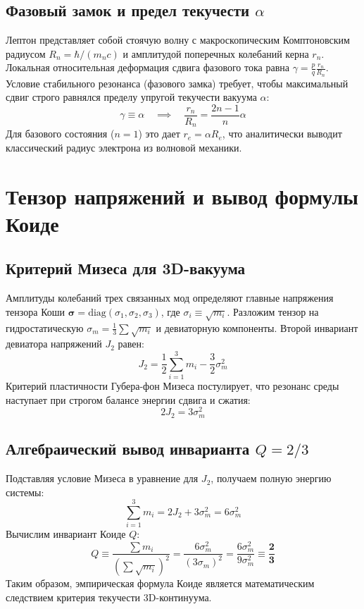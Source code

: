\documentclass[12pt,a4paper]{article}
\begin{document}
	\subsection{Фазовый замок и предел текучести $\alpha$}
	Лептон представляет собой стоячую волну с макроскопическим Комптоновским радиусом $R_n = \hbar / (m_n c)$ и амплитудой поперечных колебаний керна $r_n$. 
	Локальная относительная деформация сдвига фазового тока равна $\gamma = \frac{p}{q} \frac{r_n}{R_n}$.
	Условие стабильного резонанса (фазового замка) требует, чтобы максимальный сдвиг строго равнялся пределу упругой текучести вакуума $\alpha$:
	\begin{equation}
		\gamma \equiv \alpha \quad \implies \quad \frac{r_n}{R_n} = \frac{2n-1}{n} \alpha
	\end{equation}
	Для базового состояния ($n=1$) это дает $r_e = \alpha R_e$, что аналитически выводит классический радиус электрона из волновой механики.
	
	\section{Тензор напряжений и вывод формулы Коиде}
	
	\subsection{Критерий Мизеса для 3D-вакуума}
	Амплитуды колебаний трех связанных мод определяют главные напряжения тензора Коши $\boldsymbol{\sigma} = \text{diag}(\sigma_1, \sigma_2, \sigma_3)$, где $\sigma_i \equiv \sqrt{m_i}$.
	Разложим тензор на гидростатическую $\sigma_m = \frac{1}{3}\sum \sqrt{m_i}$ и девиаторную компоненты. Второй инвариант девиатора напряжений $J_2$ равен:
	\begin{equation}
		J_2 = \frac{1}{2} \sum_{i=1}^3 m_i - \frac{3}{2} \sigma_m^2
	\end{equation}
	Критерий пластичности Губера-фон Мизеса постулирует, что резонанс среды наступает при строгом балансе энергии сдвига и сжатия:
	\begin{equation}
		2 J_2 = 3 \sigma_m^2
	\end{equation}
	
	\subsection{Алгебраический вывод инварианта $Q = 2/3$}
	Подставляя условие Мизеса в уравнение для $J_2$, получаем полную энергию системы:
	\begin{equation}
		\sum_{i=1}^3 m_i = 2 J_2 + 3 \sigma_m^2 = 6 \sigma_m^2
	\end{equation}
	Вычислим инвариант Коиде $Q$:
	\begin{equation}
		Q \equiv \frac{\sum m_i}{\left( \sum \sqrt{m_i} \right)^2} = \frac{6 \sigma_m^2}{(3 \sigma_m)^2} = \frac{6 \sigma_m^2}{9 \sigma_m^2} \equiv \mathbf{\frac{2}{3}}
	\end{equation}
	Таким образом, эмпирическая формула Коиде является математическим следствием критерия текучести 3D-континуума.
	
\end{document}
